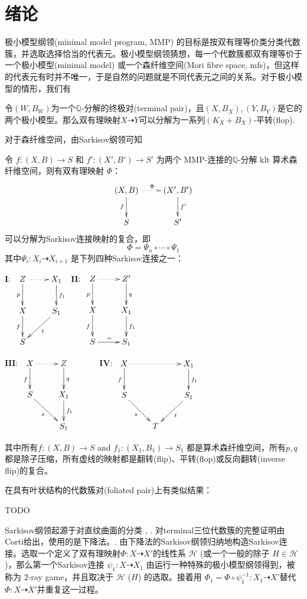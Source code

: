 \chapter{绪论}
极小模型纲领(minimal model program, MMP) 的目标是按双有理等价类分类代数簇，并选取选择恰当的代表元。极小模型纲领猜想，每一个代数簇都双有理等价于一个极小模型(minimal model) 或一个森纤维空间(Mori fibre space, mfs)，但这样的代表元有时并不唯一，于是自然的问题就是不同代表元之间的关系。对于极小模型的情形，我们有
\begin{theorem}[平转连接极小模型]
	令$(W,B_{W})$为一个$\mathbb{Q}$-分解的终极对(terminal pair)，且$(X,B_{X}),(Y,B_{Y})$是它的两个极小模型。那么双有理映射$X \dashrightarrow Y$可以分解为一系列$(K_{X}+B_{X})$-平转(flop).
\end{theorem}
对于森纤维空间，由Sarkisov纲领可知
\begin{theorem}[主定理]
	令 $ f:(X, B)\to S$ 和 $f':(X', B')\to S' $ 为两个 MMP-连接的$ \mathbb{Q} $-分解 klt 算术森纤维空间，则有双有理映射 $\Phi$：
	\[
		\xymatrix{
			(X,B)\ar[d]_f\ar@{.>}[r]^\Phi & (X',B')\ar[d]^{f'}\\
			S & S'}
	\]
	可以分解为Sarkisov连接映射的复合，即
	\[
		\Phi=\Psi_{n}\circ \cdots \circ \Psi_{1}
	\]
	其中$\Psi_{i}:X_{i}\dashrightarrow X_{i+1} $ 是下列四种Sarkisov连接之一：

	$\textbf{I}$:
	$\xymatrix{
			Z\ar[d]_p\ar@{.>}[r]&X_1\ar[d]^{f_1}\\
			X\ar[d]_f&S_1\ar[dl]^{t}\\
			S &}$
	$\textbf{II}$:
	$\xymatrix{
			Z\ar[d]_p\ar@{.>}[r]&Z'\ar[d]^{q}&\\
			X\ar[d]_{f}&X_1\ar[d]^{f_1}\\
			S\ar[r]^{\sim}&S_1}$

	$\textbf{III}$:
	$
		\xymatrix{
		X\ar@{.>}[r]\ar[d]_f& Z\ar[d]^q& \\
		S\ar[rd]_{s}         & X_{1}\ar[d]^{f_{1}}&\\
		&S_{1}
		}
	$
	$\textbf{IV}$:
	$\xymatrix{
			X\ar[d]_f\ar@{.>}[rr]&&X_1\ar[d]^{f_1}\\
			S\ar[dr]_{s}&&S_1\ar[dl]^{t}\\
			&T &}$

	其中所有$ f:(X, B)\to S $ and $ f_1:(X_1, B_1)\to S_1 $ 都是算术森纤维空间，所有$p,q$ 都是除子压缩，所有虚线的映射都是翻转(flip)、平转(flop)或反向翻转(inverse flip)的复合。
\end{theorem}
在具有叶状结构的代数簇对(foliated pair)上有类似结果：
\begin{theorem}[主定理2]
	TODO
\end{theorem}
Sarkisov纲领起源于对直纹曲面的分类 \cite{sarkisovBIRATIONALAUTOMORPHISMSCONIC1981}, \cite{sarkisovCONICBUNDLESTRUCTURES1983}.
对terminal三位代数簇的完整证明由Corti给出，使用的是下降法。\cite{cortiFactoringBirationalMaps}.
由下降法的Sarkisov纲领归纳地构造Sarkisov连接。选取一个定义了双有理映射$\Phi:X \dashrightarrow X'$的线性系 $\mathcal{H}$ (或一个一般的除子 $H \in \mathcal{H}$)，那么第一个Sarkisov连接 $\psi_1:X\dashrightarrow X_1$ 由运行一种特殊的极小模型纲领得到，被称为 $2$-ray game，并且取决于 $\mathcal{H}$ ($H$) 的选取。接着用 $\Phi_{1}=\Phi\circ \psi_1^{-1}: X_1 \dashrightarrow X'$替代 $\Phi:X\dashrightarrow X'$并重复这一过程。

